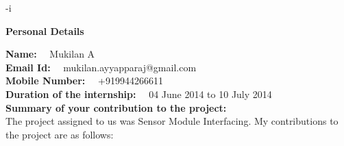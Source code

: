 -i\documentclass[a4paper,12 pt]{article}
\begin{document}
\begin{center}
\textbf{\large Personal Details}
\end{center}
\hspace{-1mm}
\vspace{5mm}\textbf{Name: } \ \ Mukilan A\\ 
\vspace{5mm}\textbf{Email Id: } \ \ mukilan.ayyapparaj@gmail.com\\
\vspace{5mm}\textbf{Mobile Number: } \ \ +919944266611\\
\vspace{5mm}\textbf{Duration of the internship: } \ \ 04 June 2014 to 10 July 2014\\
\vspace{5mm}\textbf{Summary of your contribution to the project: }\\
The project assigned to us was Sensor Module Interfacing. My contributions to the project are as follows:
\end{document}
